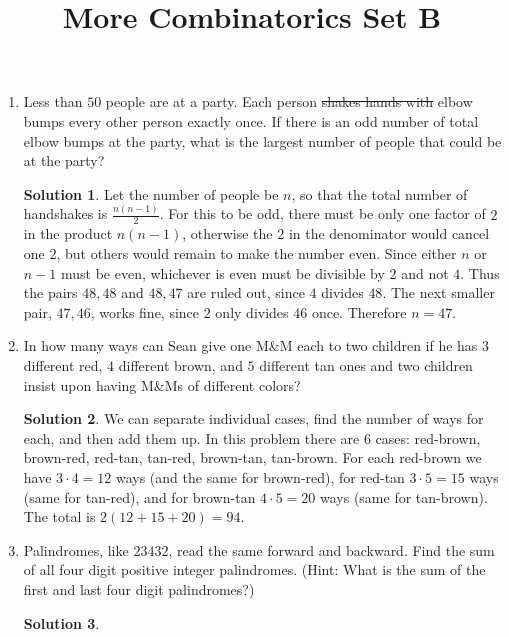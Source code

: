 \documentclass[twocolumn]{article}
\title{More Combinatorics Set B}
\author{}
\date{}
\theoremstyle{definition}
\newtheorem*{solution}{Solution}
\begin{document}
\maketitle
\begin{enumerate}
    \item Less than $50$ people are at a party.
        Each person \sout{shakes hands with} elbow bumps every other person exactly once.
        If there is an odd number of total elbow bumps at the party,
        what is the largest number of people that could be at the party?
        \begin{solution}
            Let the number of people be $n$,
            so that the total number of handshakes is $\frac{n(n - 1)}{2}$.
            For this to be odd, there must be only one factor of $2$ in the product $n(n - 1)$,
            otherwise the $2$ in the denominator would cancel one $2$,
            but others would remain to make the number even.
            Since either $n$ or $n - 1$ must be even,
            whichever is even must be divisible by $2$ and not $4$.
            Thus the pairs $48, 48$ and $48, 47$ are ruled out, since $4$ divides $48$.
            The next smaller pair, $47, 46$, works fine, since $2$ only divides $46$ once.
            Therefore $n = 47$.
        \end{solution}
    \item In how many ways can Sean give one M\&M each to two children
        if he has $3$ different red, $4$ different brown, and $5$ different tan ones
        and two children insist upon having M\&Ms of different colors?
        \vspace{3cm}
        \begin{solution}
            We can separate individual cases, find the number of ways for each,
            and then add them up.
            In this problem there are $6$ cases:
            red-brown, brown-red, red-tan, tan-red, brown-tan, tan-brown.
            For each red-brown we have $3 \cdot 4 = 12$ ways (and the same for brown-red),
            for red-tan $3 \cdot 5 = 15$ ways (same for tan-red),
            and for brown-tan $4 \cdot 5 = 20$ ways (same for tan-brown).
            The total is $2(12 + 15 + 20) = 94$.
        \end{solution}
    \item Palindromes, like $23432$, read the same forward and backward.
        Find the sum of all four digit positive integer palindromes.
        (Hint: What is the sum of the first and last four digit palindromes?)
        \begin{solution}

\end{solution}
\end{enumerate}
\end{document}
